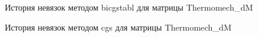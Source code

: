 \begin{figure}[H]
    \renewcommand{\figurename}{Рисунок}
    \caption{История невязок методом bicgstabl для матрицы Thermomech\_dM}
    \label{fig:image_25}
\end{figure}

\begin{figure}[H]
    \renewcommand{\figurename}{Рисунок}
    \caption{История невязок методом cgs для матрицы Thermomech\_dM}
    \label{fig:image_26}
\end{figure}

